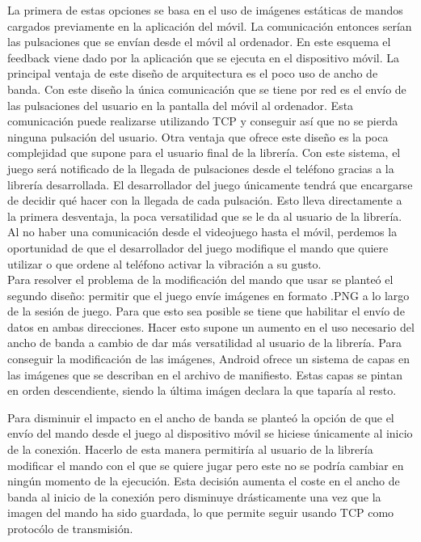 La primera de estas opciones se basa en el uso de im\'agenes est\'aticas de mandos cargados previamente en la aplicaci\'on del m\'ovil. La comunicaci\'on entonces ser\'ian las pulsaciones que se env\'ian desde el m\'ovil al ordenador.  En este esquema el feedback viene dado por la aplicaci\'on que se ejecuta en el dispositivo m\'ovil. La principal ventaja de este dise\~no de arquitectura es el poco uso de ancho de banda. Con este dise\~no la \'unica comunicaci\'on que se tiene por red  es el env\'io de las pulsaciones del usuario en la pantalla del m\'ovil al ordenador. Esta comunicaci\'on puede realizarse utilizando TCP y conseguir as\'i que no se pierda ninguna pulsaci\'on del usuario. Otra ventaja que ofrece este dise\~no es la poca complejidad que supone para el usuario final de la librer\'ia. Con este sistema, el juego ser\'a notificado de la llegada de pulsaciones desde el tel\'efono gracias a la librer\'ia desarrollada. El desarrollador del juego \'unicamente tendr\'a que encargarse de decidir qu\'e hacer con la llegada de cada pulsaci\'on. Esto lleva directamente a la primera desventaja, la poca versatilidad que se le da al usuario de la librer\'ia. Al no haber una comunicaci\'on desde el videojuego hasta el m\'ovil, perdemos la oportunidad de que el desarrollador del juego modifique el mando que quiere utilizar o que ordene al tel\'efono activar la vibraci\'on a su gusto.\\

Para resolver el problema de la modificaci\'on del mando que usar se plante\'o el segundo dise\~no: permitir que el juego env\'ie im\'agenes en formato .PNG a lo largo de la sesi\'on de juego. Para que esto sea posible se tiene que habilitar el env\'io de datos en ambas direcciones. Hacer esto supone un aumento en el uso necesario del ancho de banda a cambio de dar m\'as versatilidad al usuario de la librer\'ia. Para conseguir la modificaci\'on de las im\'agenes, Android ofrece un sistema de capas en las im\'agenes que se describan en el archivo de manifiesto. Estas capas se pintan en orden descendiente, siendo la \'ultima im\'agen declara la que tapar\'ia al resto. 

Para disminuir el impacto en el ancho de banda se plante\'o la opci\'on de que el env\'io del mando desde el juego al dispositivo m\'ovil se hiciese \'unicamente al inicio de la conexi\'on. Hacerlo de esta manera permitir\'ia al usuario de la librer\'ia modificar el mando con el que se quiere jugar pero este no se podr\'ia cambiar en ning\'un momento de la ejecuci\'on. Esta decisi\'on aumenta el coste en el ancho de banda al inicio de la conexi\'on pero disminuye dr\'asticamente una vez que la imagen del mando ha sido guardada, lo que permite seguir usando TCP como protoc\'olo de transmisi\'on.\\


